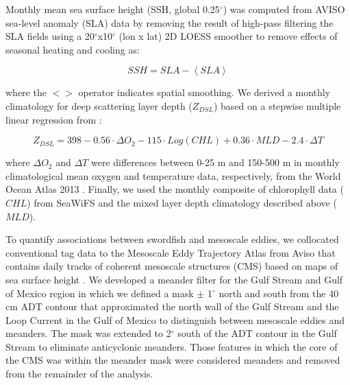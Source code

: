 Monthly mean sea surface height (SSH, global 0.25$^{\circ}$) was computed from AVISO sea-level anomaly (SLA) data by removing the result of high-pass filtering the SLA fields using a 20$^\circ$x10$^\circ$ (lon x lat) 2D LOESS smoother to remove effects of seasonal heating and cooling \citep{Chelton2011} as:

\begin{equation}
SSH = SLA - \left<SLA\right>
\end{equation}

where the $<>$ operator indicates spatial smoothing. We derived a monthly climatology for deep scattering layer depth (\(Z_{DSL}\)) based on a stepwise multiple linear regression from \citet{Bianchi2013}:

\begin{equation}
Z_{DSL} = 398 - 0.56 \cdot \Delta O_2 - 115 \cdot Log(CHL) + 0.36 \cdot MLD - 2.4 \cdot \Delta T
\label{eq:dsl}
\end{equation}

where \(\Delta O_2\) and \(\Delta T\) were differences between 0-25 m and 150-500 m in monthly climatological mean oxygen and temperature data, respectively, from the World Ocean Atlas 2013 \citep{Garcia2013, Locarnini2013}. Finally, we used the monthly composite of chlorophyll data (\(CHL\)) from SeaWiFS and the mixed layer depth climatology described above (\(MLD\)).

To quantify associations between swordfish and mesoscale eddies, we collocated conventional tag data to the Mesoscale Eddy Trajectory Atlas from Aviso that contains daily tracks of coherent mesoscale structures (CMS) based on maps of sea surface height \citep{Chelton2011}. We developed a meander filter \citep[similar to][]{Gaube2017DSR} for the Gulf Stream and Gulf of Mexico region in which we defined a mask \(\pm\) 1$^{\circ}$ north and south from the 40 cm ADT contour that approximated the north wall of the Gulf Stream and the Loop Current in the Gulf of Mexico to distinguish between mesoscale eddies and meanders. The mask was extended to 2$^{\circ}$ south of the ADT contour in the Gulf Stream to eliminate anticyclonic meanders. Those features in which the core of the CMS was within the meander mask were considered meanders and removed from the remainder of the analysis.

